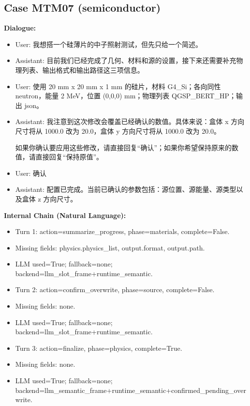 \documentclass[11pt]{ctexart}
\begin{document}
\subsection{Case MTM07 (semiconductor)}
\textbf{Dialogue:}
\begin{itemize}
\item User: 我想搭一个硅薄片的中子照射测试，但先只给一个简述。
\item Assistant: 目前我们已经完成了几何、材料和源的设置，接下来还需要补充物理列表、输出格式和输出路径这三项信息。
\item User: 使用 20 mm x 20 mm x 1 mm 的硅片，材料 G4\_Si；各向同性 neutron，能量 2 MeV，位置 (0,0,0) mm；物理列表 QGSP\_BERT\_HP；输出 json。
\item Assistant: 我注意到这次修改会覆盖已经确认的数值。具体来说：盒体 x 方向尺寸将从 1000.0 改为 20.0，盒体 y 方向尺寸将从 1000.0 改为 20.0。

如果你确认要应用这些修改，请直接回复“确认”；如果你希望保持原来的数值，请直接回复“保持原值”。
\item User: 确认
\item Assistant: 配置已完成。当前已确认的参数包括：源位置、源能量、源类型以及盒体 z 方向尺寸。
\end{itemize}
\textbf{Internal Chain (Natural Language):}
\begin{itemize}
\item Turn 1: action=summarize\_progress, phase=materials, complete=False.
\item Missing fields: physics.physics\_list, output.format, output.path.
\item LLM used=True; fallback=none; backend=llm\_slot\_frame+runtime\_semantic.
\item Turn 2: action=confirm\_overwrite, phase=source, complete=False.
\item Missing fields: none.
\item LLM used=True; fallback=none; backend=llm\_slot\_frame+runtime\_semantic.
\item Turn 3: action=finalize, phase=physics, complete=True.
\item Missing fields: none.
\item LLM used=True; fallback=none; backend=llm\_semantic\_frame+runtime\_semantic+confirmed\_pending\_overwrite.
\end{itemize}
\end{document}
